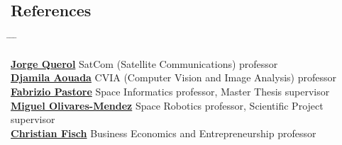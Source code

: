 \documentclass[a4paper,10pt]{article}
\begin{document}
\subsection*{References}
\begin{tabbing}
    \hspace{0.55cm} \= \hspace{4.55cm} \= \hspace{3cm} \= \kill %

    \> \href{https://www.linkedin.com/in/jorgequerol/}{\textbf{Jorge Querol}}  \> SatCom (Satellite Communications) professor\\
    \> \href{https://www.linkedin.com/in/djamilaaouada/}{\textbf{Djamila Aouada}}  \> CVIA (Computer Vision and Image Analysis) professor\\
    \> \href{https://www.linkedin.com/in/fabrizio-pastore-41226b4/}{\textbf{Fabrizio Pastore}}  \> Space Informatics professor, Master Thesis supervisor\\
    \> \href{https://www.linkedin.com/in/miguel-a-olivares-mendez-8a952533/}{\textbf{Miguel Olivares-Mendez}}  \> Space Robotics professor, Scientific Project supervisor\\
    \> \href{https://www.linkedin.com/in/christian-fisch-7745ba167/}{\textbf{Christian Fisch}}  \> Business Economics and Entrepreneurship professor\\

\end{tabbing}
\end{document}
